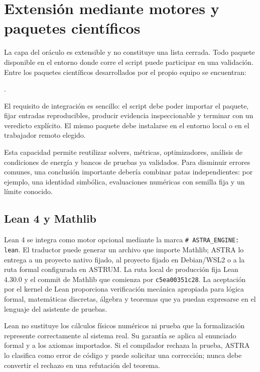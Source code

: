 \documentclass[11pt,a4paper]{article}
\begin{document}
\section{Extensión mediante motores y paquetes científicos}

La capa del oráculo es extensible y no constituye una lista cerrada. Todo paquete disponible en el entorno donde corre el script puede participar en una validación. Entre los paquetes científicos desarrollados por el propio equipo se encuentran:

\begin{center}
\quad {}\quad {}.
\end{center}

El requisito de integración es sencillo: el script debe poder importar el paquete, fijar entradas reproducibles, producir evidencia inspeccionable y terminar con un veredicto explícito. El mismo paquete debe instalarse en el entorno local o en el trabajador remoto elegido.

Esta capacidad permite reutilizar solvers, métricas, optimizadores, análisis de condiciones de energía y bancos de pruebas ya validados. Para disminuir errores comunes, una conclusión importante debería combinar patas independientes: por ejemplo, una identidad simbólica, evaluaciones numéricas con semilla fija y un límite conocido.

\subsection{Lean 4 y Mathlib}

Lean 4 se integra como motor opcional mediante la marca \texttt{\# ASTRA\_ENGINE: lean}. El traductor puede generar un archivo que importe Mathlib; ASTRA lo entrega a un proyecto nativo fijado, al proyecto fijado en Debian/WSL2 o a la ruta formal configurada en ASTRUM. La ruta local de producción fija Lean 4.30.0 y el commit de Mathlib que comienza por \texttt{c5ea00351c28}. La aceptación por el kernel de Lean proporciona verificación mecánica apropiada para lógica formal, matemáticas discretas, álgebra y teoremas que ya puedan expresarse en el lenguaje del asistente de pruebas.

Lean no sustituye los cálculos físicos numéricos ni prueba que la formalización represente correctamente al sistema real. Su garantía se aplica al enunciado formal y a los axiomas importados. Si el compilador rechaza la prueba, ASTRA lo clasifica como error de código y puede solicitar una corrección; nunca debe convertir el rechazo en una refutación del teorema.
\end{document}
